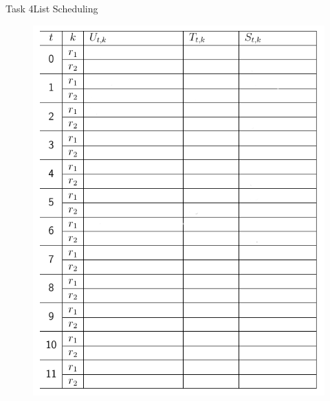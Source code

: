 \begin{frame}[allowframebreaks]{Task 4}{List Scheduling}
  \begin{solutionnoinc}
    \begin{figure}
      \centering
      \includegraphics[height=0.5\paperheight]{./figures/task4_schedule_empty.png}
    \end{figure}
  \end{solutionnoinc}
  \framebreak
  \begin{solution}
    \begin{figure}
      \centering

\end{figure}
\end{solution}
\end{frame}
